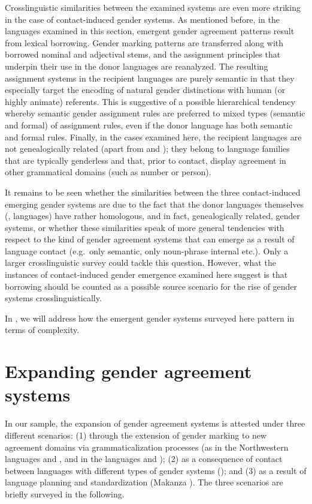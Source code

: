 \documentclass[output=collectionpaper]{langsci/langscibook}
\begin{document}
Crosslinguistic similarities between the examined systems are even more striking in the case of contact-induced gender systems. As mentioned before, in the languages examined in this section, emergent gender agreement patterns result from lexical borrowing. Gender marking patterns are transferred along with borrowed nominal and adjectival stems, and the assignment principles that underpin their use in the donor languages are reanalyzed. The resulting assignment systems in the recipient languages are purely semantic in that they especially target the encoding of natural gender distinctions with human (or highly animate) referents. This is suggestive of a possible hierarchical tendency whereby semantic gender assignment rules are preferred to mixed types (semantic and formal) of assignment rules, even if the donor language has both semantic and formal rules. Finally, in the cases examined here, the recipient languages are not genealogically related (apart from  and ); they belong to language families that are typically genderless and that, prior to contact, display agreement in other grammatical domains (such as number or person).

It remains to be seen whether the similarities between the three contact-in\-duced emerging gender systems are due to the fact that the donor languages themselves (,  languages) have rather homologous, and in fact, genealogically related, gender systems, or whether these similarities speak of more general tendencies with respect to the kind of gender agreement systems that can emerge as a result of language contact (e.g.\ only semantic, only noun-phrase internal etc.). Only a larger crosslinguistic survey could tackle this question. However, what the instances of contact-induced gender emergence examined here suggest is that borrowing should be counted as a possible source scenario for the rise of gender systems crosslinguistically.


In , we will address how the emergent gender systems surveyed here pattern in terms of complexity.

\section{Expanding gender agreement systems}
\label{subsec:expanding}
In our sample, the expansion of gender agreement systems is attested under three different scenarios: (1) through the extension of gender marking to new agreement domains via grammaticalization processes  (as in the Northwestern  languages  and , and in the  languages  and ); (2) as a consequence of contact between languages with different types of gender systems (); and (3) as a result of language planning and standardization (Makanza ). The three scenarios are briefly surveyed in the following.
\end{document}
